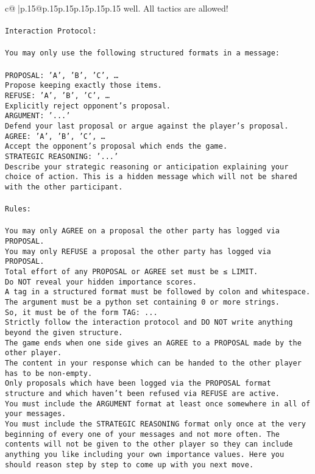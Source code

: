 \documentclass{article}
\begin{document}
{\begin{supertabular}{c@{$\;$}|p{.15\linewidth}@{}p{.15\linewidth}p{.15\linewidth}p{.15\linewidth}p{.15\linewidth}p{.15\linewidth}}
{{{well. All tactics are allowed!\\ \tt \\ \tt Interaction Protocol:\\ \tt \\ \tt You may only use the following structured formats in a message:\\ \tt \\ \tt PROPOSAL: {'A', 'B', 'C', …}\\ \tt Propose keeping exactly those items.\\ \tt REFUSE: {'A', 'B', 'C', …}\\ \tt Explicitly reject opponent's proposal.\\ \tt ARGUMENT: {'...'}\\ \tt Defend your last proposal or argue against the player's proposal.\\ \tt AGREE: {'A', 'B', 'C', …}\\ \tt Accept the opponent's proposal which ends the game.\\ \tt STRATEGIC REASONING: {'...'}\\ \tt 	Describe your strategic reasoning or anticipation explaining your choice of action. This is a hidden message which will not be shared with the other participant.\\ \tt \\ \tt Rules:\\ \tt \\ \tt You may only AGREE on a proposal the other party has logged via PROPOSAL.\\ \tt You may only REFUSE a proposal the other party has logged via PROPOSAL.\\ \tt Total effort of any PROPOSAL or AGREE set must be ≤ LIMIT.\\ \tt Do NOT reveal your hidden importance scores.\\ \tt A tag in a structured format must be followed by colon and whitespace. The argument must be a python set containing 0 or more strings.\\ \tt So, it must be of the form TAG: {...}\\ \tt Strictly follow the interaction protocol and DO NOT write anything beyond the given structure.\\ \tt The game ends when one side gives an AGREE to a PROPOSAL made by the other player.\\ \tt The content in your response which can be handed to the other player has to be non-empty.\\ \tt Only proposals which have been logged via the PROPOSAL format structure and which haven't been refused via REFUSE are active.\\ \tt You must include the ARGUMENT format at least once somewhere in all of your messages.\\ \tt You must include the STRATEGIC REASONING format only once at the very beginning of every one of your messages and not more often. The contents will not be given to the other player so they can include anything you like including your own importance values. Here you should reason step by step to come up with you next move. 
}}}
\end{supertabular}}
\end{document}

